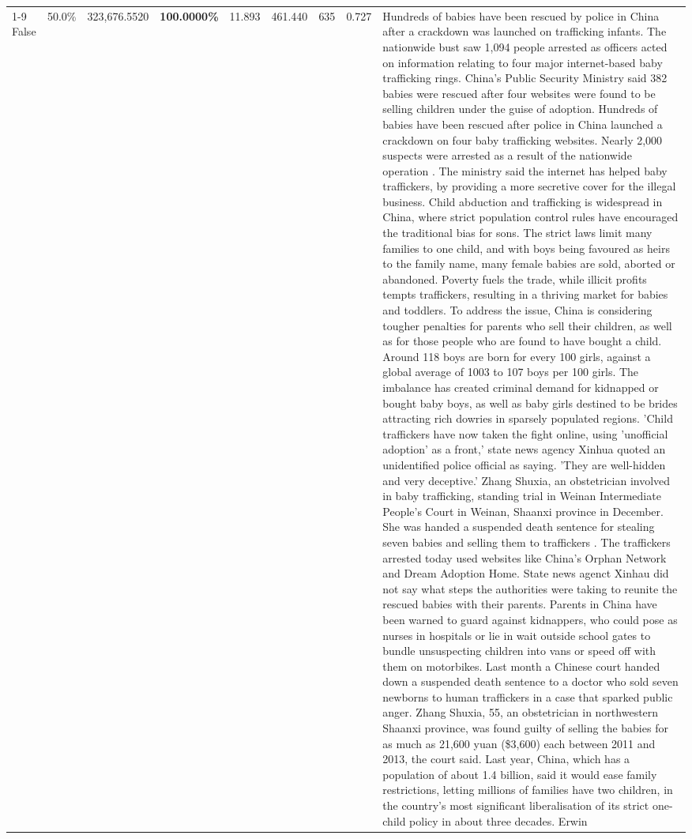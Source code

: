 \begin{table}[H]
\begin{tabular}{lllrlllll}
\cline{1-9}
False & 50.0\% & 323,676.5520 & \bfseries \color{red} 100.0000\% & 11.893 & 461.440 & 635 & 0.727 & Hundreds of babies have been rescued by police in China after a crackdown was launched on trafficking infants. The nationwide bust saw 1,094 people arrested as officers acted on information relating to four major internet-based baby trafficking rings. China's Public Security Ministry said 382 babies were rescued after four websites were found to be selling children under the guise of adoption. Hundreds of babies have been rescued after police in China launched a crackdown on four baby trafficking websites. Nearly 2,000 suspects were arrested as a result of the nationwide operation . The ministry said the internet has helped baby traffickers, by providing a more secretive cover for the illegal business. Child abduction and trafficking is widespread in China, where strict population control rules have encouraged the traditional bias for sons. The strict laws limit many families to one child, and with boys being favoured as heirs to the family name, many female babies are sold, aborted or abandoned. Poverty fuels the trade, while illicit profits tempts traffickers, resulting in a thriving market for babies and toddlers. To address the issue, China is considering tougher penalties for parents who sell their children, as well as for those people who are found to have bought a child. Around 118 boys are born for every 100 girls, against a global average of 1003 to 107 boys per 100 girls. The imbalance has created criminal demand for kidnapped or bought baby boys, as well as baby girls destined to be brides attracting rich dowries in sparsely populated regions. 'Child traffickers have now taken the fight online, using 'unofficial adoption' as a front,' state news agency Xinhua quoted an unidentified police official as saying. 'They are well-hidden and very deceptive.' Zhang Shuxia, an obstetrician involved in baby trafficking, standing trial in Weinan Intermediate People's Court in Weinan, Shaanxi province in December. She was handed a suspended death sentence for stealing seven babies and selling them to traffickers . The traffickers arrested today used websites like China's Orphan Network and Dream Adoption Home. State news agenct Xinhau did not say what steps the authorities were taking to reunite the rescued babies with their parents. Parents in China have been warned to guard against kidnappers, who could pose as nurses in hospitals or lie in wait outside school gates to bundle unsuspecting children into vans or speed off with them on motorbikes. Last month a Chinese court handed down a suspended death sentence to a doctor who sold seven newborns to human traffickers in a case that sparked public anger. Zhang Shuxia, 55, an obstetrician in northwestern Shaanxi province, was found guilty of selling the babies for as much as 21,600 yuan (\$3,600) each between 2011 and 2013, the court said. Last year, China, which has a population of about 1.4 billion, said it would ease family restrictions, letting millions of families have two children, in the country's most significant liberalisation of its strict one-child policy in about three decades. Erwin \\

\end{tabular}
\end{table}
